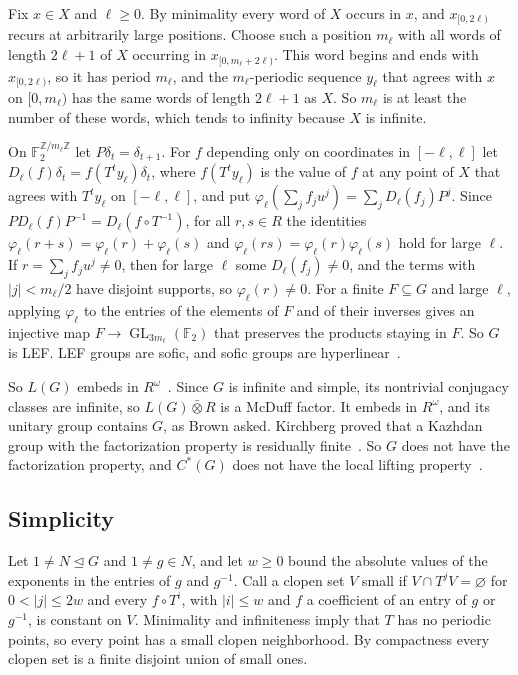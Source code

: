 \documentclass[11pt]{amsart}
\newcommand{\F}{\mathbb F}
\newcommand{\Z}{\mathbb Z}
\newcommand{\GL}{\operatorname{GL}}
\begin{document}
Fix $x\in X$ and $\ell\ge0$. By minimality every word of $X$ occurs in
$x$, and $x_{[0,2\ell)}$ recurs at arbitrarily large positions. Choose
such a position $m_\ell$ with all words of length $2\ell+1$ of $X$
occurring in $x_{[0,m_\ell+2\ell)}$. This word begins and ends with
$x_{[0,2\ell)}$, so it has period $m_\ell$, and the $m_\ell$-periodic
sequence $y_\ell$ that agrees with $x$ on $[0,m_\ell)$ has the same words
of length $2\ell+1$ as $X$. So $m_\ell$ is at least the number of these
words, which tends to infinity because $X$ is infinite.

On $\F_2^{\Z/m_\ell\Z}$ let $P\delta_t=\delta_{t+1}$. For $f$ depending
only on coordinates in $[-\ell,\ell]$ let
$D_\ell(f)\delta_t=f(T^ty_\ell)\delta_t$, where $f(T^ty_\ell)$ is the value
of $f$ at any point of $X$ that agrees with $T^ty_\ell$ on $[-\ell,\ell]$,
and put $\varphi_\ell(\sum_jf_ju^j)=\sum_jD_\ell(f_j)P^j$. Since
$PD_\ell(f)P^{-1}=D_\ell(f\circ T^{-1})$, for all $r,s\in R$ the identities
$\varphi_\ell(r+s)=\varphi_\ell(r)+\varphi_\ell(s)$ and
$\varphi_\ell(rs)=\varphi_\ell(r)\varphi_\ell(s)$ hold for large $\ell$. If
$r=\sum_jf_ju^j\ne0$, then for large $\ell$ some $D_\ell(f_j)\ne0$, and the
terms with $|j|<m_\ell/2$ have disjoint supports, so $\varphi_\ell(r)\ne0$.
For a finite $F\subseteq G$ and large $\ell$, applying $\varphi_\ell$ to the
entries of the elements of $F$ and of their inverses gives an injective
map $F\to\GL_{3m_\ell}(\F_2)$ that preserves the products staying in $F$.
So $G$ is LEF. LEF groups are sofic, and sofic groups are
hyperlinear~\cite[Example~4.5 and Theorem~3.3]{Pestov}.

So $L(G)$ embeds in $R^\omega$~\cite[Proposition~7.1]{Ozawa}. Since $G$
is infinite and simple, its nontrivial conjugacy classes are infinite,
so $L(G)\mathbin{\bar\otimes}R$ is a McDuff factor. It embeds in
$R^\omega$, and its unitary group contains $G$, as Brown asked. Kirchberg
proved that a Kazhdan group with the factorization property is
residually finite~\cite[Theorem~1.1]{Kirchberg}. So $G$ does not have the
factorization property, and $C^*(G)$ does not have the local lifting
property~\cite[p.~527]{Ozawa}.

\subsection*{Simplicity}
Let $1\ne N\trianglelefteq G$ and $1\ne g\in N$, and let $w\ge0$ bound
the absolute values of the exponents in the entries of $g$ and $g^{-1}$.
Call a clopen set $V$ small if $V\cap T^jV=\varnothing$ for
$0<|j|\le2w$ and every $f\circ T^i$, with $|i|\le w$ and $f$ a
coefficient of an entry of $g$ or $g^{-1}$, is constant on $V$.
Minimality and infiniteness imply that $T$ has no periodic points, so
every point has a small clopen neighborhood. By compactness every clopen
set is a finite disjoint union of small ones.
\end{document}

